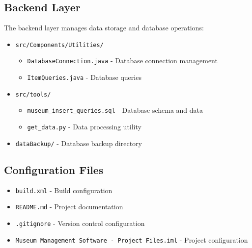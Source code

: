 \documentclass[12pt,a4paper]{article}
\begin{document}
\subsection{Backend Layer}
The backend layer manages data storage and database operations:

\begin{itemize}
    \item \texttt{src/Components/Utilities/}
    \begin{itemize}
        \item \texttt{DatabaseConnection.java} - Database connection management
        \item \texttt{ItemQueries.java} - Database queries
    \end{itemize}
    
    \item \texttt{src/tools/}
    \begin{itemize}
        \item \texttt{museum\_insert\_queries.sql} - Database schema and data
        \item \texttt{get\_data.py} - Data processing utility
    \end{itemize}
    
    \item \texttt{dataBackup/} - Database backup directory
\end{itemize}

\subsection{Configuration Files}
\begin{itemize}
    \item \texttt{build.xml} - Build configuration
    \item \texttt{README.md} - Project documentation
    \item \texttt{.gitignore} - Version control configuration
    \item \texttt{Museum Management Software - Project Files.iml} - Project configuration
\end{itemize}
\end{document}
